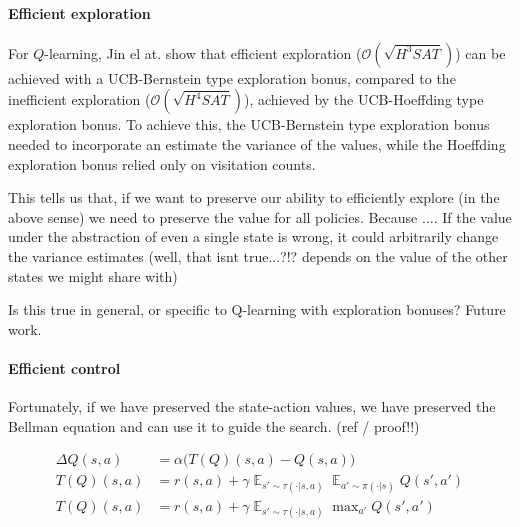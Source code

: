 \paragraph{Efficient exploration}

For $Q$-learning, Jin el at. \cite{Bubeck2018} show that efficient exploration ($\mathcal O(\sqrt{H^3SAT})$\footnotemark[13]) can be 
achieved with a UCB-Bernstein type exploration bonus, compared to the inefficient exploration ($\mathcal O(\sqrt{H^4SAT})$),
achieved by the UCB-Hoeffding type exploration bonus. To achieve this, the UCB-Bernstein type exploration bonus needed to incorporate an 
estimate the variance of the values, while the Hoeffding exploration bonus relied only on visitation counts.


This tells us that, if we want to preserve our ability to efficiently explore (in the above sense) we need to preserve the value for all policies.
Because ....
If the value under the abstraction of even a single state is wrong, it could arbitrarily change the variance estimates 
(well, that isnt true...?!? depends on the value of the other states we might share with)

Is this true in general, or specific to Q-learning with exploration bonuses? Future work.

\paragraph{Efficient control}

Fortunately, if we have preserved the state-action values, we have preserved the Bellman equation and can use it to guide the search. {\color{red}(ref / proof!!)}

\begin{align*}
\Delta Q(s, a) &= \alpha \big(T(Q)(s, a) - Q(s, a) \big) \\
T(Q)(s, a) &= r(s, a) + \gamma \mathop{\mathbb E}_{s'\sim \tau(\cdot|s, a)} \mathop{\mathbb E}_{a'\sim \pi(\cdot|s)} Q(s', a') \tag{SARSA} \\
T(Q)(s, a) &= r(s, a) + \gamma \mathop{\mathbb E}_{s'\sim \tau(\cdot|s, a)} \mathop{\text{max}}_{a'} Q(s', a') \tag{Q-learning} 
\end{align*}

